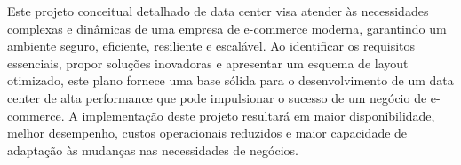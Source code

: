 \documentclass[
	12pt,				%
	oneside,			%
	a4paper,			%
	english,			%
	brazil				%
	]{abntex2unama}
\begin{document}
Este projeto conceitual detalhado de data center visa atender às necessidades complexas e dinâmicas de uma empresa de e-commerce moderna, garantindo um ambiente seguro, eficiente, resiliente e escalável. Ao identificar os requisitos essenciais, propor soluções inovadoras e apresentar um esquema de layout otimizado, este plano fornece uma base sólida para o desenvolvimento de um data center de alta performance que pode impulsionar o sucesso de um negócio de e-commerce. A implementação deste projeto resultará em maior disponibilidade, melhor desempenho, custos operacionais reduzidos e maior capacidade de adaptação às mudanças nas necessidades de negócios.

\postextual



%
%

\end{document}
